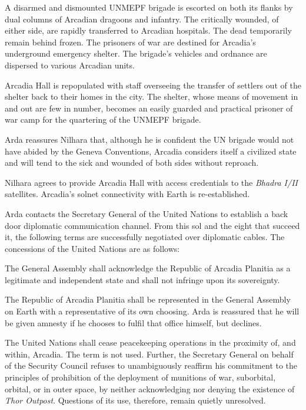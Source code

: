 

A disarmed and dismounted UNMEPF brigade is escorted on both its flanks by dual columns of Arcadian dragoons and infantry. The critically wounded, of either side, are rapidly transferred to Arcadian hospitals. The dead temporarily remain behind frozen. The prisoners of war are destined for Arcadia's underground emergency shelter. The brigade's vehicles and ordnance are dispersed to various Arcadian units.

Arcadia Hall is repopulated with staff overseeing the transfer of settlers out of the shelter back to their homes in the city. The shelter, whose means of movement in and out are few in number, becomes an easily guarded and practical prisoner of war camp for the quartering of the UNMEPF brigade.

Arda reassures Nilhara that, although he is confident the UN brigade would not have abided by the Geneva Conventions, Arcadia considers itself a civilized state and will tend to the sick and wounded of both sides without reproach.
\StopTimelineDate

Nilhara agrees to provide Arcadia Hall with access credentials to the {\it Bhadra I/II} satellites. Arcadia's solnet connectivity with Earth is re-established.

Arda contacts the Secretary General of the United Nations to establish a back door diplomatic communication channel. From this sol and the eight that succeed it, the following terms are successfully negotiated over diplomatic cables. The concessions of the United Nations are as follows:

\startitemize[R]
\item The General Assembly shall acknowledge the Republic of Arcadia Planitia as a legitimate and independent state and shall not infringe upon its sovereignty.

\item The Republic of Arcadia Planitia shall be represented in the General Assembly on Earth with a representative of its own choosing. Arda is reassured that he will be given amnesty if he chooses to fulfil that office himself, but declines.

\item The United Nations shall cease peacekeeping operations in the proximity of, and within, Arcadia. The term  is not used. Further, the Secretary General on behalf of the Security Council refuses to unambiguously reaffirm his commitment to the principles of prohibition of the deployment of munitions of war, suborbital, orbital, or in outer space, by neither acknowledging nor denying the existence of {\it Thor Outpost}. Questions of its use, therefore, remain quietly unresolved.
\stopitemize

